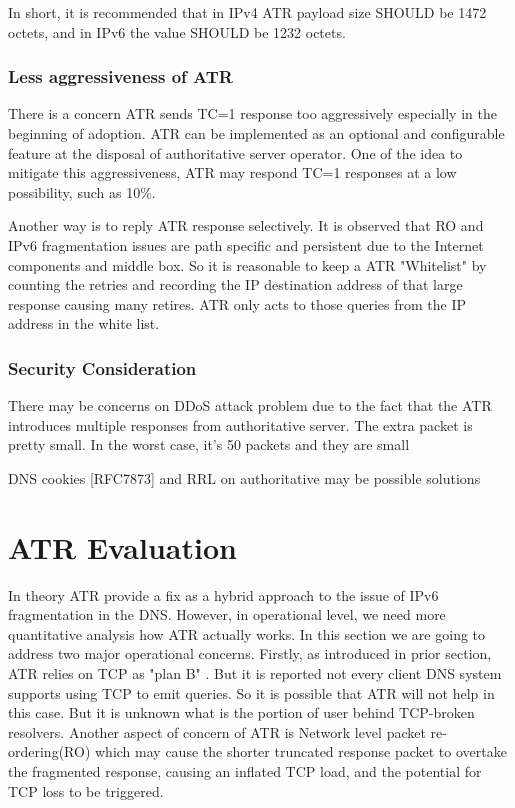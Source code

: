    In short, it is recommended that in IPv4 ATR payload size SHOULD be
   1472 octets, and in IPv6 the value SHOULD be 1232 octets.

   \subsubsection{Less aggressiveness of ATR}

   There is a concern ATR sends TC=1 response too aggressively
   especially in the beginning of adoption.  ATR can be implemented as
   an optional and configurable feature at the disposal of authoritative
   server operator.  One of the idea to mitigate this aggressiveness,
   ATR may respond TC=1 responses at a low possibility, such as 10\%.

   Another way is to reply ATR response selectively.  It is observed
   that RO and IPv6 fragmentation issues are path specific and
   persistent due to the Internet components and middle box.  So it is
   reasonable to keep a ATR "Whitelist" by counting the retries and
   recording the IP destination address of that large response causing
   many retires.  ATR only acts to those queries from the IP address in
   the white list.

   \subsubsection{Security Consideration}

   There may be concerns on DDoS attack problem due to the fact that the
   ATR introduces multiple responses from authoritative server.  The
   extra packet is pretty small.  In the worst case, it's 50%
   packets and they are small

   DNS cookies [RFC7873] and RRL on authoritative may be possible
   solutions


\section{ATR Evaluation}

In theory ATR provide a fix as a hybrid approach to the issue of
IPv6 fragmentation in the DNS. However, in
operational level, we need more quantitative analysis how ATR actually
works. In this section we are going to address two major operational
concerns. Firstly, as introduced in prior section, ATR relies on TCP as "plan B" .
But it is reported not every client DNS system supports using
TCP to emit queries. So it is possible that ATR will not help in
this case. But it is unknown what is the portion of user behind
TCP-broken resolvers. Another aspect of concern of ATR is Network
level packet re-ordering(RO) which may cause the shorter truncated
response packet to overtake the fragmented response, causing an
inflated TCP load, and the potential for TCP loss to be triggered.

